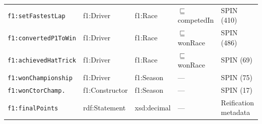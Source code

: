 \begin{center}
\begin{tabularx}{\linewidth}{@{}lllp{2.2cm}X@{}}
\texttt{f1:setFastestLap}   & f1:Driver      & f1:Race        & $\sqsubseteq$ competedIn & SPIN (410) \\
\texttt{f1:convertedP1ToWin}& f1:Driver      & f1:Race        & $\sqsubseteq$ wonRace     & SPIN (486) \\
\texttt{f1:achievedHatTrick}& f1:Driver      & f1:Race        & $\sqsubseteq$ wonRace     & SPIN (69) \\
\texttt{f1:wonChampionship} & f1:Driver      & f1:Season      & ---               & SPIN (75) \\
\texttt{f1:wonCtorChamp.}   & f1:Constructor & f1:Season      & ---               & SPIN (17) \\
\texttt{f1:finalPoints}     & rdf:Statement  & xsd:decimal    & ---               & Reification metadata \\
\bottomrule
\end{tabularx}
\end{center}
